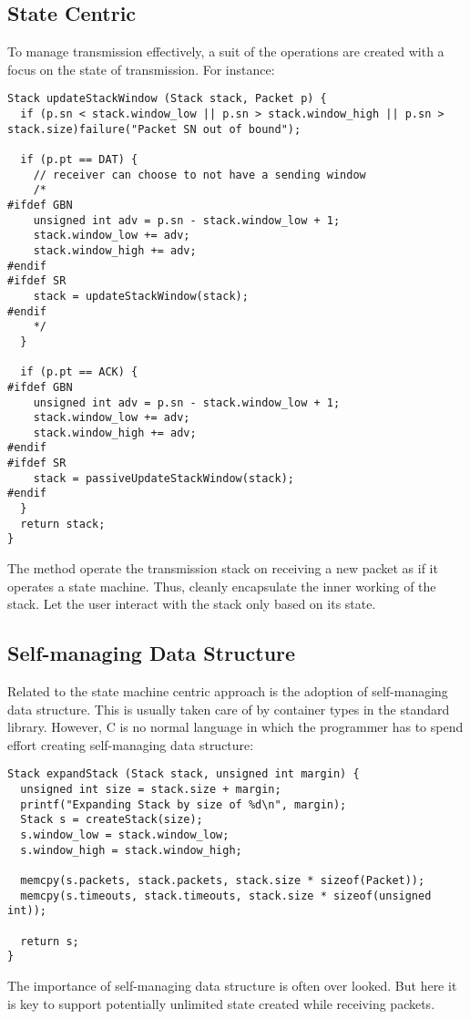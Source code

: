 \documentclass[12pt]{article}
\begin{document}
\subsection{State Centric}
To manage transmission effectively, a suit of the operations are created with a focus on the state of transmission. For instance:
\begin{samepage}
\begin{verbatim}
Stack updateStackWindow (Stack stack, Packet p) {
  if (p.sn < stack.window_low || p.sn > stack.window_high || p.sn > stack.size)failure("Packet SN out of bound");
  
  if (p.pt == DAT) {
    // receiver can choose to not have a sending window
    /*
#ifdef GBN    
    unsigned int adv = p.sn - stack.window_low + 1;
    stack.window_low += adv;
    stack.window_high += adv;
#endif
#ifdef SR
    stack = updateStackWindow(stack);
#endif
    */
  }
  
  if (p.pt == ACK) {
#ifdef GBN
    unsigned int adv = p.sn - stack.window_low + 1;
    stack.window_low += adv;
    stack.window_high += adv;
#endif
#ifdef SR
    stack = passiveUpdateStackWindow(stack);
#endif
  }
  return stack;
}
\end{verbatim}
\end{samepage}
The method operate the transmission stack on receiving a new packet as if it operates a state machine. Thus, cleanly encapsulate the inner working of the stack. Let the user interact with the stack only based on its state.

\subsection{Self-managing Data Structure}
Related to the state machine centric approach is the adoption of self-managing data structure. This is usually taken care of by container types in the standard library. However, C is no normal language in which the programmer has to spend effort creating self-managing data structure:
\begin{samepage}
\begin{verbatim}
Stack expandStack (Stack stack, unsigned int margin) {
  unsigned int size = stack.size + margin;
  printf("Expanding Stack by size of %d\n", margin);
  Stack s = createStack(size);
  s.window_low = stack.window_low;
  s.window_high = stack.window_high;
  
  memcpy(s.packets, stack.packets, stack.size * sizeof(Packet));
  memcpy(s.timeouts, stack.timeouts, stack.size * sizeof(unsigned int));
  
  return s;
}
\end{verbatim}
\end{samepage}
The importance of self-managing data structure is often over looked. But here it is key to support potentially unlimited state created while receiving packets.
\end{document}
